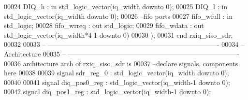 \begin{DoxyCode}
00024       \textcolor{vhdlchar}{DIQ_h}         \textcolor{vhdlchar}{:} \textcolor{keywordflow}{in} \textcolor{comment}{std\_logic\_vector}\textcolor{vhdlchar}{(}\textcolor{vhdlchar}{iq_width} \textcolor{keywordflow}{downto} \textcolor{vhdllogic}{}\textcolor{vhdllogic}{0}\textcolor{vhdlchar}{)};
00025         \textcolor{vhdlchar}{DIQ_l}          \textcolor{vhdlchar}{:} \textcolor{keywordflow}{in} \textcolor{comment}{std\_logic\_vector}\textcolor{vhdlchar}{(}\textcolor{vhdlchar}{iq_width} \textcolor{keywordflow}{downto} \textcolor{vhdllogic}{}\textcolor{vhdllogic}{0}\textcolor{vhdlchar}{)};
00026 \textcolor{keyword}{      --fifo ports }
00027       \textcolor{vhdlchar}{fifo_wfull}  \textcolor{vhdlchar}{:} \textcolor{keywordflow}{in} \textcolor{comment}{std\_logic};
00028       \textcolor{vhdlchar}{fifo_wrreq}  \textcolor{vhdlchar}{:} \textcolor{keywordflow}{out} \textcolor{comment}{std\_logic};
00029       \textcolor{vhdlchar}{fifo_wdata}  \textcolor{vhdlchar}{:} \textcolor{keywordflow}{out} \textcolor{comment}{std\_logic\_vector}\textcolor{vhdlchar}{(}\textcolor{vhdlchar}{iq_width}\textcolor{vhdlchar}{*}\textcolor{vhdllogic}{4-1} \textcolor{keywordflow}{downto} \textcolor{vhdllogic}{}\textcolor{vhdllogic}{0}\textcolor{vhdlchar}{)}   
00030         \textcolor{vhdlchar}{)};
00031 \textcolor{keywordflow}{end} \textcolor{vhdlchar}{rxiq\_siso\_sdr};
00032 
00033 \textcolor{keyword}{-- ----------------------------------------------------------------------------}
00034 \textcolor{keyword}{-- Architecture}
00035 \textcolor{keyword}{-- ----------------------------------------------------------------------------}
00036 \textcolor{keywordflow}{architecture} arch \textcolor{keywordflow}{of} rxiq_siso_sdr is
00037 \textcolor{keyword}{--declare signals,  components here}
00038 
00039 \textcolor{keywordflow}{signal} \textcolor{vhdlchar}{sdr_reg_0}            \textcolor{vhdlchar}{:} \textcolor{comment}{std\_logic\_vector}\textcolor{vhdlchar}{(}\textcolor{vhdlchar}{iq_width} \textcolor{keywordflow}{downto} \textcolor{vhdllogic}{}\textcolor{vhdllogic}{0}\textcolor{vhdlchar}{)};
00040 
00041 \textcolor{keywordflow}{signal} \textcolor{vhdlchar}{diq_pos0_reg}         \textcolor{vhdlchar}{:} \textcolor{comment}{std\_logic\_vector}\textcolor{vhdlchar}{(}\textcolor{vhdlchar}{iq_width}\textcolor{vhdlchar}{-}\textcolor{vhdllogic}{}\textcolor{vhdllogic}{1} \textcolor{keywordflow}{downto} \textcolor{vhdllogic}{}\textcolor{vhdllogic}{0}\textcolor{vhdlchar}{)};
00042 \textcolor{keywordflow}{signal} \textcolor{vhdlchar}{diq_pos1_reg}        \textcolor{vhdlchar}{:} \textcolor{comment}{std\_logic\_vector}\textcolor{vhdlchar}{(}\textcolor{vhdlchar}{iq_width}\textcolor{vhdlchar}{-}\textcolor{vhdllogic}{}\textcolor{vhdllogic}{1} \textcolor{keywordflow}{downto} \textcolor{vhdllogic}{}\textcolor{vhdllogic}{0}\textcolor{vhdlchar}{)};

\end{DoxyCode}
